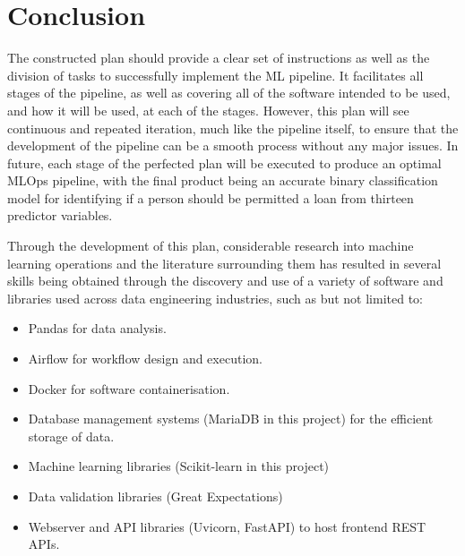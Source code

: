 \documentclass[12pt]{report}
\begin{document}
\chapter*{Conclusion}
The constructed plan should provide a clear set of instructions as well as the division of tasks 
to successfully implement the ML pipeline. It facilitates all stages of the pipeline, as well as 
covering all of the software intended to be used, and how it will be used, at each of the stages.
However, this plan will see continuous and repeated iteration, much like the pipeline itself, to ensure 
that the development of the pipeline can be a smooth process without any major issues.
In future, each stage of the perfected plan will be executed to produce an optimal MLOps pipeline, with the final 
product being an accurate binary classification model for identifying if a person should be permitted a 
loan from thirteen predictor variables. 


Through the development of this plan, considerable research into machine learning operations and the literature 
surrounding them has resulted in several skills being obtained through the discovery and use of 
a variety of software and libraries used across data engineering industries, such as but not limited to:

\begin{itemize}
    \item Pandas for data analysis.
    \item Airflow for workflow design and execution.
    \item Docker for software containerisation.
    \item Database management systems (MariaDB in this project) for the efficient storage of data.
    \item Machine learning libraries (Scikit-learn in this project) 
    \item Data validation libraries (Great Expectations)
    \item Webserver and API libraries (Uvicorn, FastAPI) to host frontend REST APIs.
\end{itemize}






\printbibliography
\end{document}
